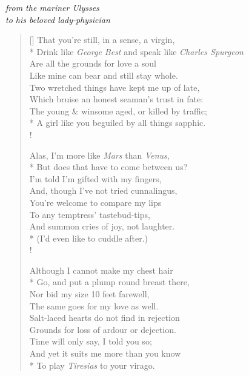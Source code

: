 \begin{center}
    \textit{from the mariner Ulysses}\\
    \textit{to his beloved lady-physician}
\end{center}

\bigskip

\settowidth{\versewidth}{Like mine can bear and still stay whole.}
\begin{verse}[\versewidth]
    That you're still, in a sense, a virgin,\\*
    Drink like \textit{George Best} and speak like \textit{Charles Spurgeon}\\
    Are all the grounds for love a soul\\
    Like mine can bear and still stay whole.\\
    Two wretched things have kept me up of late,\\
    Which bruise an honest seaman's trust in fate:\\
    The young \& winsome aged, or killed by traffic;\\*
    A girl like you beguiled by all things sapphic.\\!

    Alas, I'm more like \textit{Mars} than \textit{Venus},\\*
    But does that have to come between us?\\
    I'm told I'm gifted with my fingers,\\
    And, though I've not tried cunnalingus,\\
    You're welcome to compare my lips\\
    To any temptress' tastebud-tips,\\
    And summon cries of joy, not laughter.\\*
    (I'd even like to cuddle after.)\\!

    Although I cannot make my chest hair\\*
    Go, and put a plump round breast there,\\
    Nor bid my size 10 feet farewell,\\
    The same goes for my love as well.\\
    Salt-laced hearts do not find in rejection\\
    Grounds for loss of ardour or dejection.\\
    Time will only say, I told you so;\\
    And yet it suits me more than you know\\*
    To play \textit{Tiresias} to your virago.
\end{verse}
